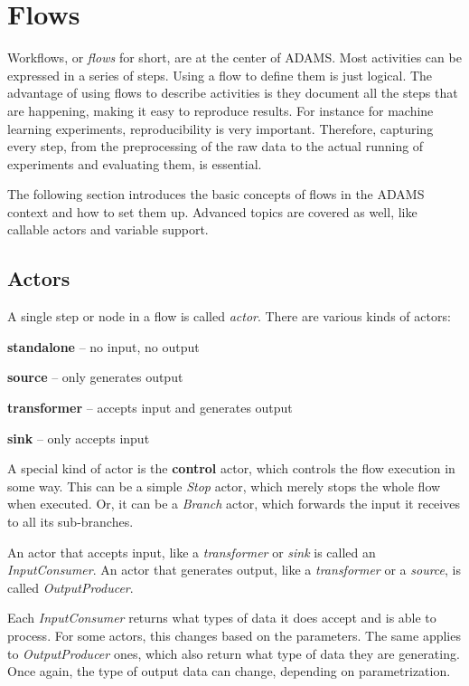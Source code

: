 
\chapter{Flows}
\label{flows}
Workflows, or \textit{flows} for short, are at the center of ADAMS. Most
activities can be expressed in a series of steps. Using a flow to define them is
just logical. The advantage of using flows to describe activities is they
document all the steps that are happening, making it easy to reproduce results.
For instance for machine learning experiments, reproducibility is very important. Therefore,
capturing every step, from the preprocessing of the raw data to the actual
running of experiments and evaluating them, is essential.

The following section introduces the basic concepts of flows in the ADAMS
context and how to set them up. Advanced topics are covered as well, like
callable actors and variable support.

\section{Actors}
A single step or node in a flow is called \textit{actor}. There are various
kinds of actors:
\begin{tight_itemize}
  \item \textbf{standalone} -- no input, no output
  \item \textbf{source} -- only generates output
  \item \textbf{transformer} -- accepts input and generates output
  \item \textbf{sink} -- only accepts input
\end{tight_itemize}
A special kind of actor is the \textbf{control} actor, which controls the flow
execution in some way. This can be a simple \textit{Stop} actor, which merely
stops the whole flow when executed. Or, it can be a \textit{Branch} actor, which
forwards the input it receives to all its sub-branches.

An actor that accepts input, like a \textit{transformer} or \textit{sink} is
called an \textit{InputConsumer}. An actor that generates output, like
a \textit{transformer} or a \textit{source}, is called \textit{OutputProducer}.

Each \textit{InputConsumer} returns what types of data it does accept and is
able to process. For some actors, this changes based on the parameters. The same
applies to \textit{OutputProducer} ones, which also return what type of data
they are generating. Once again, the type of output data can change, depending
on parametrization.

